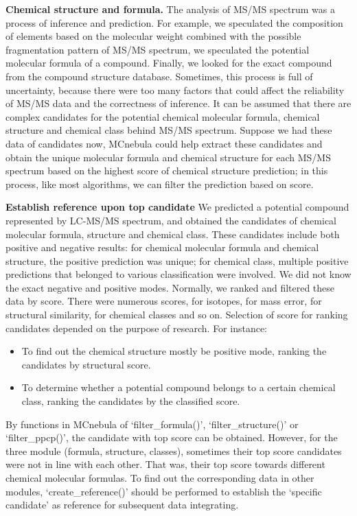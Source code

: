 \documentclass[
]{article}
\begin{document}
\textbf{Chemical structure and formula.} The analysis of MS/MS spectrum
was a process of inference and prediction. For example, we speculated
the composition of elements based on the molecular weight combined with
the possible fragmentation pattern of MS/MS spectrum, we speculated the
potential molecular formula of a compound. Finally, we looked for the
exact compound from the compound structure database. Sometimes, this
process is full of uncertainty, because there were too many factors that
could affect the reliability of MS/MS data and the correctness of
inference. It can be assumed that there are complex candidates for the
potential chemical molecular formula, chemical structure and chemical
class behind MS/MS spectrum. Suppose we had these data of candidates
now, MCnebula could help extract these candidates and obtain the unique
molecular formula and chemical structure for each MS/MS spectrum based
on the highest score of chemical structure prediction; in this process,
like most algorithms, we can filter the prediction based on score.

\textbf{Establish reference upon top candidate} We predicted a potential
compound represented by LC-MS/MS spectrum, and obtained the candidates
of chemical molecular formula, structure and chemical class. These
candidates include both positive and negative results: for chemical
molecular formula and chemical structure, the positive prediction was
unique; for chemical class, multiple positive predictions that belonged
to various classification were involved. We did not know the exact
negative and positive modes. Normally, we ranked and filtered these data
by score. There were numerous scores, for isotopes, for mass error, for
structural similarity, for chemical classes and so on. Selection of
score for ranking candidates depended on the purpose of research. For
instance:

\begin{itemize}
\item
  To find out the chemical structure mostly be positive mode, ranking
  the candidates by structural score.
\item
  To determine whether a potential compound belongs to a certain
  chemical class, ranking the candidates by the classified score.
\end{itemize}

By functions in MCnebula of `filter\_formula()', `filter\_structure()'
or `filter\_ppcp()', the candidate with top score can be obtained.
However, for the three module (formula, structure, classes), sometimes
their top score candidates were not in line with each other. That was,
their top score towards different chemical molecular formulas. To find
out the corresponding data in other modules, `create\_reference()'
should be performed to establish the `specific candidate' as reference
for subsequent data integrating.
\end{document}
